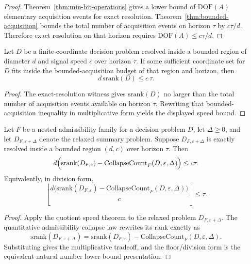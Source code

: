 \begin{proof}
Theorem~\ref{thm:min-bit-operations} gives a lower bound of $\mathrm{DOF}(A)$ elementary acquisition events for exact resolution. Theorem~\ref{thm:bounded-acquisition} bounds the total number of acquisition events on horizon $\tau$ by $c\tau/d$. Therefore exact resolution on that horizon requires $\mathrm{DOF}(A) \le c\tau/d$.
\end{proof}

\begin{theorem}\label{thm:quotient-resolution-speed-bound}
Let $D$ be a finite-coordinate decision problem resolved inside a bounded region of diameter $d$ and signal speed $c$ over horizon $\tau$. If some sufficient coordinate set for $D$ fits inside the bounded-acquisition budget of that region and horizon, then
\[
d\,\mathrm{srank}(D) \le c\,\tau.
\]
\end{theorem}

\begin{proof}
The exact-resolution witness gives $\mathrm{srank}(D)$ no larger than the total number of acquisition events available on horizon $\tau$. Rewriting that bounded-acquisition inequality in multiplicative form yields the displayed speed bound.
\end{proof}

\begin{theorem}\label{thm:admissibility-speed-accuracy-tradeoff}
Let $F$ be a nested admissibility family for a decision problem $D$, let $\Delta\ge 0$, and let $D_{F,\varepsilon+\Delta}$ denote the relaxed summary problem. Suppose $D_{F,\varepsilon+\Delta}$ is exactly resolved inside a bounded region $(d,c)$ over horizon $\tau$. Then
\[
d\Bigl(\mathrm{srank}(D_{F,\varepsilon})-
\mathrm{CollapseCount}_F(D,\varepsilon,\Delta)\Bigr)
\le c\tau.
\]
Equivalently, in division form,
\[
\left\lfloor
\frac{d\bigl(\mathrm{srank}(D_{F,\varepsilon})-
\mathrm{CollapseCount}_F(D,\varepsilon,\Delta)\bigr)}{c}
\right\rfloor
\le \tau.
\]
\end{theorem}

\begin{proof}
Apply the quotient speed theorem to the relaxed problem $D_{F,\varepsilon+\Delta}$. The quantitative admissibility collapse law rewrites its rank exactly as
\[
\mathrm{srank}(D_{F,\varepsilon+\Delta})
=
\mathrm{srank}(D_{F,\varepsilon})-
\mathrm{CollapseCount}_F(D,\varepsilon,\Delta).
\]
Substituting gives the multiplicative tradeoff, and the floor/division form is the equivalent natural-number lower-bound presentation.
\end{proof}

